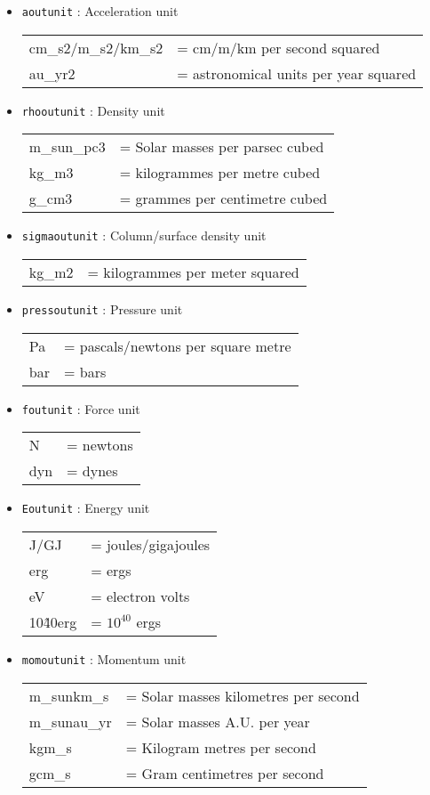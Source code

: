 \documentclass[a4paper]{article}
\newcommand{\var}[1]{\texttt{#1}}
\begin{document}
\begin{itemize}
\item \var{aoutunit} : Acceleration unit \\
\begin{tabular}{ll}
cm\_s2/m\_s2/km\_s2 & = cm/m/km per second squared \\
au\_yr2             & = astronomical units per year squared
\end{tabular}

\item \var{rhooutunit} : Density unit \\
\begin{tabular}{ll}
m\_sun\_pc3 & = Solar masses per parsec cubed \\
kg\_m3      & = kilogrammes per metre cubed \\
g\_cm3      & = grammes per centimetre cubed
\end{tabular}

\item \var{sigmaoutunit} : Column/surface density unit \\
\begin{tabular}{ll}
kg\_m2      & = kilogrammes per meter squared
\end{tabular}

\item \var{pressoutunit} : Pressure unit \\
\begin{tabular}{ll}
Pa    & = pascals/newtons per square metre \\
bar   & = bars
\end{tabular}

\item \var{foutunit} : Force unit \\
\begin{tabular}{ll}
N    & = newtons \\
dyn  & = dynes
\end{tabular}

\item \var{Eoutunit} : Energy unit \\
\begin{tabular}{ll}
J/GJ      & = joules/gigajoules \\
erg       & = ergs \\
eV        & = electron volts \\
10\^40erg & = $10^{40}$ ergs
\end{tabular}

\item \var{momoutunit} : Momentum unit \\
\begin{tabular}{ll}
m\_sunkm\_s  & = Solar masses kilometres per second \\
m\_sunau\_yr & = Solar masses A.U. per year \\
kgm\_s       & = Kilogram metres per second \\
gcm\_s       & = Gram centimetres per second
\end{tabular}


\end{itemize}
\end{document}
